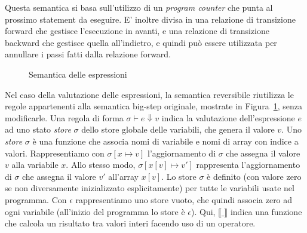 \documentclass{article}
\theoremstyle{plain}
\theoremstyle{definition}
\theoremstyle{plain}
\newcommand \tuple[2]{ #1 \vdash #2}
\newcommand{\emptystore}{\epsilon}
\begin{document}
Questa semantica si basa sull'utilizzo di un \emph{program counter} che punta al prossimo statement da eseguire. E' inoltre divisa in una relazione di transizione forward che gestisce l'esecuzione in avanti, e una relazione di transizione backward che gestisce quella all'indietro, e quindi può essere utilizzata per annullare i passi fatti dalla relazione forward.

\begin{figure}[h]
\small
\caption{Semantica delle espressioni} \label{fig:exp}
\end{figure}

Nel caso della valutazione delle espressioni, la semantica reversibile riutilizza le regole appartenenti alla semantica big-step originale, mostrate in Figura~\ref{fig:exp}, senza modificarle. Una regola di forma $\tuple{\sigma}{e} \Downarrow  v$ indica la valutazione dell'espressione $e$ ad uno stato \emph{store} $\sigma$ dello store globale delle variabili, che genera il valore $v$. Uno \emph{store} $\sigma$ è una funzione che associa nomi di variabile e nomi di array con indice a valori. Rappresentiamo con $\sigma[x \mapsto v]$ l'aggiornamento di $\sigma$ che assegna il valore $v$ alla variabile $x$. Allo stesso modo, $\sigma[x[v] \mapsto v']$ rappresenta l'aggiornamento di $\sigma$ che assegna il valore $v'$ all'array $x[v]$. Lo store $\sigma$ è definito (con valore zero se non diversamente inizializzato esplicitamente) per tutte le variabili usate nel programma. Con $\emptystore$ rappresentiamo uno store vuoto, che quindi associa zero ad ogni variabile (all'inizio del programma lo store è $\emptystore$). Qui, $\llbracket \_ \rrbracket$ indica una funzione che calcola un risultato tra valori interi facendo uso di un operatore.
\end{document}
